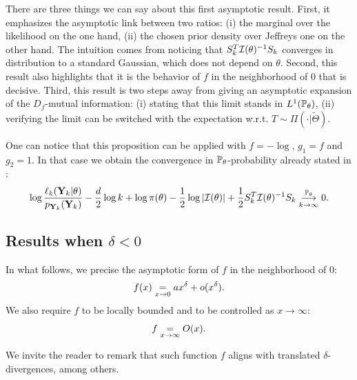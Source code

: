 There are three things we can say about this first asymptotic result. %
First, it emphasizes the asymptotic link {between two ratios: (i) the marginal over the likelihood on the one hand, (ii) the chosen prior density over Jeffreys one on the other hand.}  
The intuition comes from noticing that $S_k^T\cI(\theta)^{-1}S_k$ converges in distribution to a standard Gaussian, which does not depend on $\theta$.
Second, 
this result also highlights that it is the behavior of $f$ in the neighborhood of $0$ that is decisive.
Third, this result is two steps away from giving an asymptotic expansion of the $D_f$-mutual information: (i) stating that this limit stands in $L^1(\PP_{\theta})$, (ii) verifying the limit can be switched with the expectation w.r.t. $T\sim\varPi(\cdot|\tilde\Theta)$.




One can notice that this proposition can be applied with $f=-\log$, $g_1=f$ and $g_2=1$. 
In that case we obtain the convergence in $\PP_\theta$-probability already stated in \cite{clarke_information-theoretic_1990}:
    \begin{equation}
        \log\frac{\ell_k(\mbf Y_k|\theta)}{p_{\mbf Y_k}(\mbf Y_k)} - \frac{d}{2}\log k + \log\pi(\theta) - \frac{1}{2}\log|\cI(\theta)| +\frac{1}{2}S_k^T\cI(\theta)^{-1}S_k  \conv[\PP_\theta]{k\rightarrow\infty} 0.
    \end{equation}







\subsection{Results when $\delta<0$}

In what follows, we precise the asymptotic form of $f$ in the neighborhood of $0$:
    \begin{equation}
        f(x) \aseq{x\rightarrow0} a x^\delta + o(x^\delta).
    \end{equation}
We also require $f$ to be locally bounded and to be controlled as $x\to\infty$: 
\begin{equation}
    f\aseq{x\rightarrow\infty}O(x).
\end{equation}

We invite the reader to remark that such function $f$ aligns with translated $\delta$-divergences, among others.

